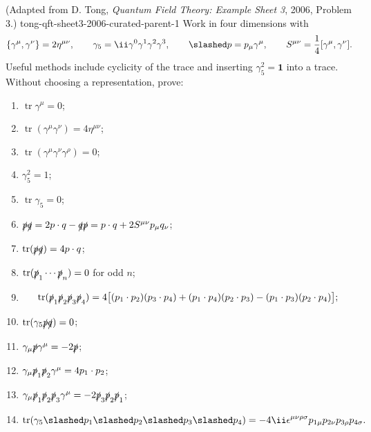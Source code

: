\begin{enumerate}
  {(Adapted from D. Tong, \emph{Quantum Field Theory: Example Sheet 3}, 2006, Problem 3.)}
  {tong-qft-sheet3-2006-curated-parent-1}
Work in four dimensions with
\[
 \{\gamma^\mu,\gamma^\nu\}=2\eta^{\mu\nu},\qquad
 \gamma_5=\ii\gamma^0\gamma^1\gamma^2\gamma^3,\qquad
 \slashed p=p_\mu\gamma^\mu,\qquad
 S^{\mu\nu}=\frac14[\gamma^\mu,\gamma^\nu].
\]
Useful methods include cyclicity of the trace and inserting
\(\gamma_5^2=\mathbf1\) into a trace.
Without choosing a representation, prove:
\begin{enumerate}
\item \(\operatorname{tr}\gamma^\mu=0\);
\item \(\operatorname{tr}(\gamma^\mu\gamma^\nu)=4\eta^{\mu\nu}\);
\item \(\operatorname{tr}(\gamma^\mu\gamma^\nu\gamma^\rho)=0\);
\item \(\gamma_5^2=1\);
\item \(\operatorname{tr}\gamma_5=0\);
\item
\(\slashed p\slashed q
=2p\cdot q-\slashed q\slashed p
=p\cdot q+2S^{\mu\nu}p_\mu q_\nu\);
\item \(\operatorname{tr}(\slashed p\slashed q)=4p\cdot q\);
\item
\(\operatorname{tr}(\slashed p_1\cdots\slashed p_n)=0\) for odd \(n\);
\item
\[
\operatorname{tr}(\slashed p_1\slashed p_2\slashed p_3\slashed p_4)
=4\bigl[
(p_1\cdot p_2)(p_3\cdot p_4)
+(p_1\cdot p_4)(p_2\cdot p_3)
-(p_1\cdot p_3)(p_2\cdot p_4)\bigr];
\]
\item \(\operatorname{tr}(\gamma_5\slashed p\slashed q)=0\);
\item \(\gamma_\mu\slashed p\gamma^\mu=-2\slashed p\);
\item
\(\gamma_\mu\slashed p_1\slashed p_2\gamma^\mu
=4p_1\cdot p_2\);
\item
\(\gamma_\mu\slashed p_1\slashed p_2\slashed p_3\gamma^\mu
=-2\slashed p_3\slashed p_2\slashed p_1\);
\item
\[
\operatorname{tr}(\gamma_5
\slashed p_1\slashed p_2\slashed p_3\slashed p_4)
=-4\ii\epsilon^{\mu\nu\rho\sigma}
p_{1\mu}p_{2\nu}p_{3\rho}p_{4\sigma}.
\]
\end{enumerate}


\end{enumerate}
